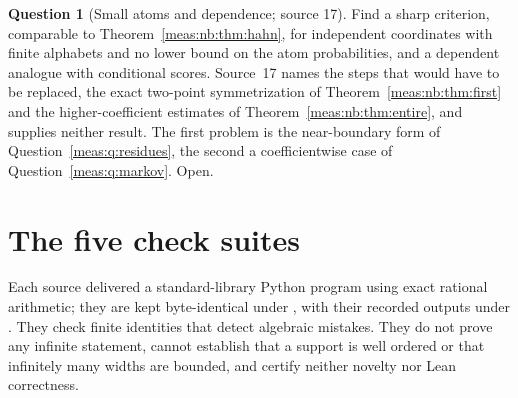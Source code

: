 \documentclass[11pt]{article}
\numberwithin{equation}{section}
\theoremstyle{definition}
\newtheorem{question}[theorem]{Question}
\theoremstyle{remark}
\begin{document}
\begin{question}[Small atoms and dependence; source 17]\label{meas:nb:q:alphabets}
Find a sharp criterion, comparable to Theorem~\ref{meas:nb:thm:hahn}, for independent
coordinates with finite alphabets and no lower bound on the atom probabilities, and
a dependent analogue with conditional scores. Source~17 names the steps that would
have to be replaced, the exact two-point symmetrization of
Theorem~\ref{meas:nb:thm:first} and the higher-coefficient estimates of
Theorem~\ref{meas:nb:thm:entire}, and supplies neither result. The first problem is
the near-boundary form of Question~\ref{meas:q:residues}, the second a
coefficientwise case of Question~\ref{meas:q:markov}. Open.
\end{question}

\section{The five check suites}\label{meas:sec:verification}

Each source delivered a standard-library Python program using exact rational
arithmetic; they are kept byte-identical under , with their recorded
outputs under . They check finite identities that detect algebraic
mistakes. They do not prove any infinite statement, cannot establish that a support
is well ordered or that infinitely many widths are bounded, and certify neither
novelty nor Lean correctness.
\end{document}
